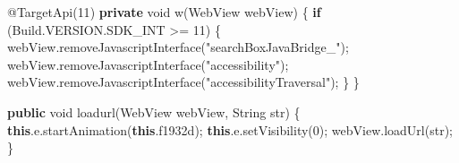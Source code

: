 \documentclass[
]{article}
\newenvironment{Shaded}{}{}
\newcommand{\AttributeTok}[1]{\textcolor[rgb]{0.49,0.56,0.16}{#1}}
\newcommand{\BuiltInTok}[1]{\textcolor[rgb]{0.00,0.50,0.00}{#1}}
\newcommand{\ControlFlowTok}[1]{\textcolor[rgb]{0.00,0.44,0.13}{\textbf{#1}}}
\newcommand{\DataTypeTok}[1]{\textcolor[rgb]{0.56,0.13,0.00}{#1}}
\newcommand{\DecValTok}[1]{\textcolor[rgb]{0.25,0.63,0.44}{#1}}
\newcommand{\FunctionTok}[1]{\textcolor[rgb]{0.02,0.16,0.49}{#1}}
\newcommand{\KeywordTok}[1]{\textcolor[rgb]{0.00,0.44,0.13}{\textbf{#1}}}
\newcommand{\NormalTok}[1]{#1}
\newcommand{\OperatorTok}[1]{\textcolor[rgb]{0.40,0.40,0.40}{#1}}
\newcommand{\StringTok}[1]{\textcolor[rgb]{0.25,0.44,0.63}{#1}}
\begin{document}
\begin{Shaded}
\begin{Highlighting}[]
    \AttributeTok{@TargetApi}\OperatorTok{(}\DecValTok{11}\OperatorTok{)}
    \KeywordTok{private} \DataTypeTok{void} \FunctionTok{w}\OperatorTok{(}\NormalTok{WebView webView}\OperatorTok{)} \OperatorTok{\{}
        \ControlFlowTok{if} \OperatorTok{(}\NormalTok{Build}\OperatorTok{.}\FunctionTok{VERSION}\OperatorTok{.}\FunctionTok{SDK\_INT} \OperatorTok{\textgreater{}=} \DecValTok{11}\OperatorTok{)} \OperatorTok{\{}
\NormalTok{            webView}\OperatorTok{.}\FunctionTok{removeJavascriptInterface}\OperatorTok{(}\StringTok{"searchBoxJavaBridge\_"}\OperatorTok{);}
\NormalTok{            webView}\OperatorTok{.}\FunctionTok{removeJavascriptInterface}\OperatorTok{(}\StringTok{"accessibility"}\OperatorTok{);}
\NormalTok{            webView}\OperatorTok{.}\FunctionTok{removeJavascriptInterface}\OperatorTok{(}\StringTok{"accessibilityTraversal"}\OperatorTok{);}
        \OperatorTok{\}}
    \OperatorTok{\}}

    \KeywordTok{public} \DataTypeTok{void} \FunctionTok{loadurl}\OperatorTok{(}\NormalTok{WebView webView}\OperatorTok{,} \BuiltInTok{String}\NormalTok{ str}\OperatorTok{)} \OperatorTok{\{}
        \KeywordTok{this}\OperatorTok{.}\FunctionTok{e}\OperatorTok{.}\FunctionTok{startAnimation}\OperatorTok{(}\KeywordTok{this}\OperatorTok{.}\FunctionTok{f1932d}\OperatorTok{);}
        \KeywordTok{this}\OperatorTok{.}\FunctionTok{e}\OperatorTok{.}\FunctionTok{setVisibility}\OperatorTok{(}\DecValTok{0}\OperatorTok{);}
\NormalTok{        webView}\OperatorTok{.}\FunctionTok{loadUrl}\OperatorTok{(}\NormalTok{str}\OperatorTok{);}
    \OperatorTok{\}}


\end{Highlighting}
\end{Shaded}
\end{document}
